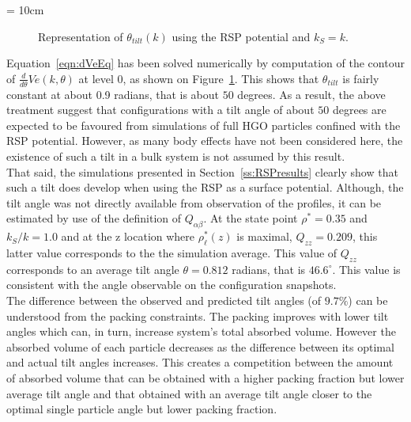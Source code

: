 \picW = 10cm
\begin{figure}
	\centering
	\caption{Representation of $\theta_{tilt}(k)$ using the RSP potential and $k_S=k$.}
	\label{fig:dVeContour_RSP_fk}
\end{figure}


Equation~\ref{eqn:dVeEq} has been solved numerically by computation of the contour of 
$\frac{d}{d\theta}Ve(k,\theta)$ at level $0$, as shown on Figure~\ref{fig:dVeContour_RSP_fk}. 
This shows that $\theta_{tilt}$ is fairly constant at about 0.9 radians, 
that is about $50$ degrees.
As a result, the above treatment suggest that configurations with a tilt angle of about $50$ 
degrees are expected to be favoured from simulations of full HGO particles confined 
with the RSP potential.
However, as many body effects  have not been considered here, the existence of 
such a tilt in a bulk system is not assumed by this result.\\

That said, the simulations presented in Section~\ref{ss:RSPresults} clearly show that such a 
tilt does develop when
using the RSP as a surface potential. Although, the tilt angle was not directly available from
observation of the profiles, it can be estimated by use of the definition of
$Q_{\alpha\beta}$. At the state point $\rho^{*} = 0.35$ and $k_S/k = 1.0$ and at the z location
where $\rho^{*}_\ell(z)$ is maximal, $Q_{zz} = 0.209$, this latter value corresponds to the 
the simulation average. This value of $Q_{zz}$ corresponds to an average tilt angle 
$\theta = 0.812$ radians, that is  $46.6^\circ$. This value is consistent 
with the angle observable on the configuration snapshots.\\
The difference between the observed and predicted tilt angles (of $9.7\%$) can be understood from the 
packing constraints. The packing improves with lower tilt angles which can, in turn, 
increase system's total absorbed volume. However the absorbed volume of each particle decreases as the
difference between its optimal and actual tilt angles increases. This creates a competition 
between the amount of absorbed volume that can be obtained with a higher packing fraction 
but lower average tilt angle and that obtained with an average tilt angle closer to the 
optimal single particle angle but lower packing fraction.\\

